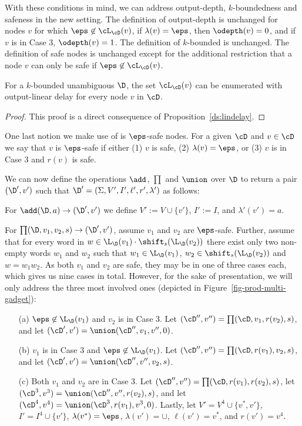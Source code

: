 With these conditions in mind, we can address output-depth, $k$-boundedness and safeness in the new setting. The definition of output-depth is unchanged for nodes $v$ for which $\eps\not\in\cL_{\cD}(v)$, if $\lambda(v) = \eps$, then $\odepth(v) = 0$, and if $v$ is in Case 3, $\odepth(v) = 1$. The definition of $k$-bounded is unchanged. The definition of safe nodes is unchanged except for the additional restriction that a node $v$ can only be safe if $\eps\not\in\cL_{\cD}(v)$.

\begin{claim}\label{slps:appendix:eps-enum}
	For a $k$-bounded unambiguous \dsepsabbr $\D$, the set $\cL_{\cD}(v)$ can be enumerated with output-linear delay for every node $v$ in $\cD$.
\end{claim}
\begin{proof}
	This proof is a direct consequence of Proposition~\ref{ds:lindelay}.
\end{proof}

One last notion we make use of is $\eps$-safe nodes. For a given \dsepsabbr $\cD$ and $v\in\cD$ we say that $v$ is $\eps$-safe if either (1) $v$ is safe, (2) $\lambda(v) = \eps$, or (3) $v$ is in Case 3 and $r(v)$ is safe.


We can now define the operations $\add$, $\prod$ and $\union$ over $\D$ to return a pair $(\D',v')$ such that $\D' = (\Sigma, V', I', \ell', r', \lambda')$ as follows:

For $\add(\D,a)\to(\D',v')$ we define $V' := V \cup \{v'\}$, $I' := I$, and $\lambda'(v') = a$.

For $\prod(\D,v_1,v_2, s) \to (\D',v')$, assume $v_1$ and $v_2$ are $\eps$-safe. 
Further, assume that for every word in $w\in\L_{\D}(v_1)\cdot\shift_s(\L_{\D}(v_2))$ there exist only two non-empty words $w_1$ and $w_2$ such that $w_1\in\L_{\D}(v_1)$, $w_2\in\shift_s(\L_{\D}(v_2))$ and $w = w_1w_2$.
As both $v_1$ and $v_2$ are safe, they may be in one of three cases each, which gives us nine cases in total. However, for the sake of presentation, we will only address the three most involved ones (depicted in Figure~\ref{fig-prod-multi-gadget}):
\begin{itemize}
	\item[(a)] $\eps\not\in\L_{\D}(v_1)$ and $v_2$ is in Case 3. Let $(\cD'', v'') = \prod(\cD, v_1, r(v_2), s)$, and let $(\cD', v') = \union(\cD'', v_1, v'', 0)$.
	\item[(b)] $v_1$ is in Case 3 and $\eps\not\in\L_{\D}(v_1)$. Let $(\cD'', v'') = \prod(\cD, r(v_1), v_2, s)$, and let $(\cD', v') = \union(\cD'', v'', v_2, s)$.
	\item[(c)] Both $v_1$ and $v_2$ are in Case 3. Let $(\cD'', v'') = \prod(\cD, r(v_1), r(v_2), s)$, let $(\cD^3, v^3) = \union(\cD'', v'', r(v_2), s)$, and let $(\cD^4, v^4) = \union(\cD^3, r(v_1), v^3, 0)$. Lastly, let $V' = V^4 \cup\{v^*, v'\}$, $I' = I^4\cup\{v'\}$, $\lambda(v^*) = \eps$, $\lambda(v') = \cup$, $\ell(v') = v^*$, and $r(v') = v^4$.
\end{itemize}

